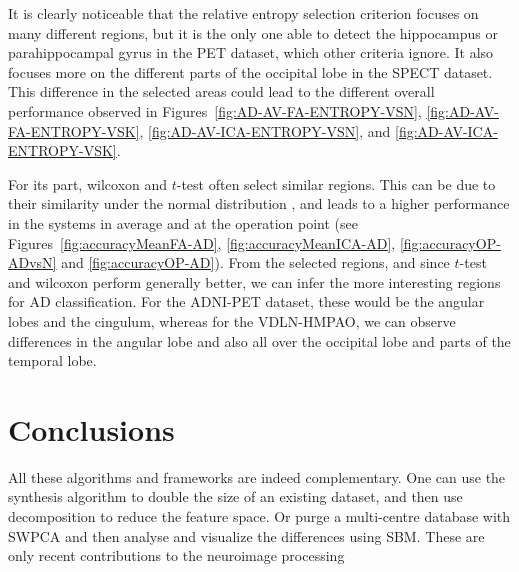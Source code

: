 It is clearly noticeable that the relative entropy selection criterion focuses on many different regions, but it is the only one able to detect the hippocampus or parahippocampal gyrus in the \ac{PET} dataset, which other criteria ignore. It also focuses more on the different parts of the occipital lobe in the \ac{SPECT} dataset. This difference in the selected areas could lead to the different overall performance observed in Figures~\ref{fig:AD-AV-FA-ENTROPY-VSN}, \ref{fig:AD-AV-FA-ENTROPY-VSK}, \ref{fig:AD-AV-ICA-ENTROPY-VSN}, and \ref{fig:AD-AV-ICA-ENTROPY-VSK}.

For its part, wilcoxon and $t$-test often select similar regions. This can be due to their similarity under the normal distribution \cite{Fay10}, and leads to a higher performance in the systems in average and at the operation point (see Figures~\ref{fig:accuracyMeanFA-AD}, \ref{fig:accuracyMeanICA-AD}, \ref{fig:accuracyOP-ADvsN} and \ref{fig:accuracyOP-AD}). From the selected regions, and since $t$-test and wilcoxon perform generally better, we can infer the more interesting regions for \ac{AD} classification. For the ADNI-PET dataset, these would be the angular lobes and the cingulum, whereas for the VDLN-HMPAO, we can observe differences in the angular lobe and also all over the occipital lobe and parts of the temporal lobe. 


\section{Conclusions}


All these algorithms and frameworks are indeed complementary. One can use the synthesis algorithm to double the size of an existing dataset, and then use decomposition to reduce the feature space. Or purge a multi-centre database with \ac{SWPCA} and then analyse and visualize the differences using \ac{SBM}. These are only recent contributions to the neuroimage processing 

